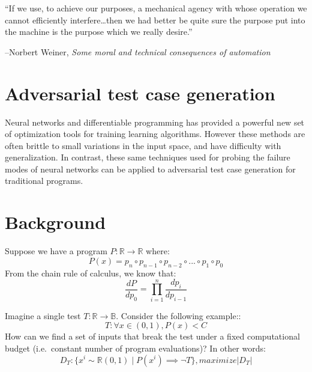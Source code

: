 \documentclass[12pt,initial,twoside,maitrise]{dms}
\numberwithin{equation}{section}
\numberwithin{table}{chapter}
\numberwithin{figure}{chapter}
\begin{document}
\setlength{\epigraphwidth}{0.78\textwidth}
\epigraph{``If we use, to achieve our purposes, a mechanical agency with whose operation we cannot efficiently interfere\ldots then we had better be quite sure the purpose put into the machine is the purpose which we really desire.''}{\begin{flushright}--Norbert Weiner, \textit{Some moral and technical consequences of automation}~\cite{wiener1960some}\end{flushright}}

\section{Adversarial test case generation}

Neural networks and differentiable programming has provided a powerful new set of optimization tools for training learning algorithms. However these methods are often brittle to small variations in the input space, and have difficulty with generalization. In contrast, these same techniques used for probing the failure modes of neural networks can be applied to adversarial test case generation for traditional programs.

\section{Background}

Suppose we have a program $P: \mathbb{R}\rightarrow\mathbb{R}$ where:
%
\begin{equation}
    P(x)=p_n \circ p_{n-1} \circ p_{n-2} \circ ... \circ p_1 \circ p_0
\end{equation}
%
From the chain rule of calculus, we know that:
%
\begin{equation}
    \frac{dP}{dp_0} = {\displaystyle \prod_{i=1}^{n} \frac{dp_{i}}{dp_{i-1}}}
\end{equation}

%
%
Imagine a single test $T: \mathbb{R} \rightarrow \mathbb{B}$. Consider the following example::
%
\begin{equation}
    T: \forall x \in (0, 1), P(x) < C
\end{equation}
%
How can we find a set of inputs that break the test under a fixed computational budget (i.e.\ constant number of program evaluations)? In other words:
%
\begin{equation}
    D_T: \{ x^i \sim \mathbb{R}(0, 1) \mid P(x^i) \implies \neg T \}, maximize |D_T|
\end{equation}
%
\end{document}
